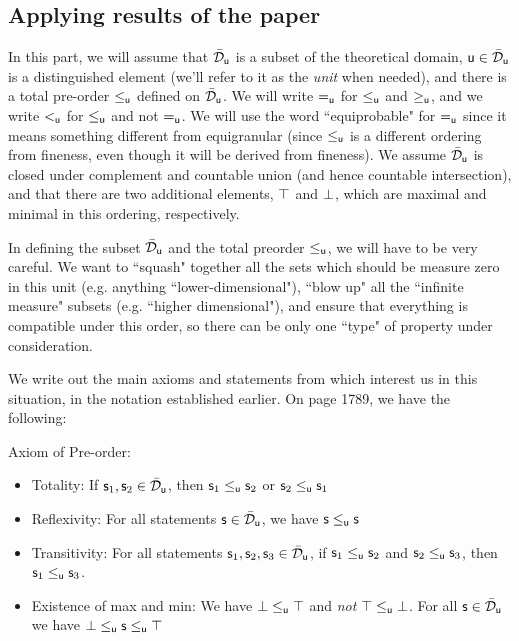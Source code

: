 \documentclass[11pt]{article}
\begin{document}
\subsection{Applying results of the paper \cite{villegas}}

In this part, we will assume that $\tdomain_{\stmt[u]}$ is a subset of the theoretical domain, $\stmt[u]\in \tdomain_{\stmt[u]}$ is a distinguished element (we'll refer to it as the \emph{unit} when needed), and there is a total pre-order $\leq_{\stmt[u]}$ defined on $\tdomain_{\stmt[u]}$. We will write $=_{\stmt[u]}$ for $\leq_{\stmt[u]}$ and $\geq_{\stmt[u]}$, and we write $<_{\stmt[u]}$ for $\leq_{\stmt[u]}$ and not $=_{\stmt[u]}$. We will use the word ``equiprobable" for $=_{\stmt[u]}$ since it means something different from equigranular (since $\leq_{\stmt[u]}$ is a different ordering from fineness, even though it will be derived from fineness). We assume $\tdomain_{\stmt[u]}$ is closed under complement and countable union (and hence countable intersection), and that there are two additional elements, $\certainty$ and $\impossibility$, which are maximal and minimal in this ordering, respectively.

\begin{remark}
In defining the subset $\tdomain_{\stmt[u]}$ and the total preorder $\leq_{\stmt[u]}$, we will have to be very careful. We want to ``squash" together all the sets which should be measure zero in this unit (e.g. anything ``lower-dimensional"), ``blow up" all the ``infinite measure" subsets (e.g. ``higher dimensional"), and ensure that everything is compatible under this order, so there can be only one ``type" of property under consideration. 
\end{remark}

We write out the main axioms and statements from \cite{villegas} which interest us in this situation, in the notation established earlier. On page 1789, we have the following:

Axiom of Pre-order:
\begin{itemize}
    \item Totality: If $\stmt_1,\stmt_2\in \tdomain_{\stmt[u]}$, then $\stmt_1 \leq_{\stmt[u]} \stmt_2$ or $\stmt_2\leq_{\stmt[u]} \stmt_1$
    \item Reflexivity: For all statements $\stmt\in \tdomain_{\stmt[u]}$, we have $\stmt\leq_{\stmt[u]}\stmt$
    \item Transitivity: For all statements $\stmt_1,\stmt_2,\stmt_3\in \tdomain_{\stmt[u]}$, if $\stmt_1\leq_{\stmt[u]}\stmt_2$ and $\stmt_2\leq_{\stmt[u]}\stmt_3$, then $\stmt_1\leq_{\stmt[u]}\stmt_3$.
    \item Existence of max and min: We have $\impossibility\leq_{\stmt[u]}\certainty$ and \emph{not} $\certainty\leq_{\stmt[u]}\impossibility$. For all $\stmt\in \tdomain_{\stmt[u]}$ we have $\impossibility\leq_{\stmt[u]}\stmt\leq_{\stmt[u]}\certainty$
\end{itemize}
\end{document}
